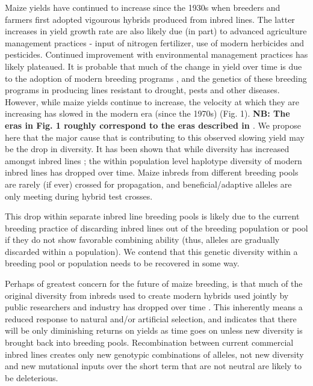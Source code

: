 \documentclass[12pt]{article}
\begin{document}
\par Maize yields have continued to increase since the 1930s when breeders and farmers first adopted vigourous hybrids produced from inbred lines. The latter increases in yield growth rate are also likely due (in part) to advanced agriculture management practices - input of nitrogen fertilizer, use of modern herbicides and pesticides. Continued improvement with environmental management practices has likely plateaued. It is probable that much of the change in yield over time is due to the adoption of modern breeding programs \citep{Duvick:2001fy}, and the genetics of these breeding programs in producing lines resistant to drought, pests and other diseases. However, while maize yields continue to increase, the velocity at which they are increasing has slowed in the modern era (since the 1970s) (Fig. 1). \textbf{NB: The eras in Fig. 1 roughly correspond to the eras described in \citep{vanHeerwaarden:2012im}}.
We propose here that the major cause that is contributing to this observed slowing yield may be the drop in diversity. It has been shown that while diversity has increased amongst inbred lines \citep{Gerke:2013tw}; the within population level haplotype diversity of modern inbred lines \citep{vanHeerwaarden:2012im} has dropped over time. Maize inbreds from different breeding pools are rarely (if ever) crossed for propagation, and beneficial/adaptive alleles are only meeting during hybrid test crosses. 
\par This drop within separate inbred line breeding pools is likely due to the current breeding practice of discarding inbred lines out of the breeding population or pool if they do not show favorable combining ability (thus, alleles are gradually discarded within a population).  We contend that this genetic diversity within a breeding pool or population needs to be recovered in some way.  
\par Perhaps of greatest concern for the future of maize breeding, is that much of the original diversity from inbreds used to create modern hybrids used jointly by public researchers and industry has dropped over time \citep{Gerke:2013tw}. This inherently means a reduced response to natural and/or artificial selection, and indicates that there will be only diminishing returns on yields as time goes on unless new diversity is brought back into breeding pools. Recombination between current commercial inbred lines creates only new genotypic combinations of alleles, not new diversity and new mutational inputs over the short term that are not neutral are likely to be deleterious.
\end{document}
